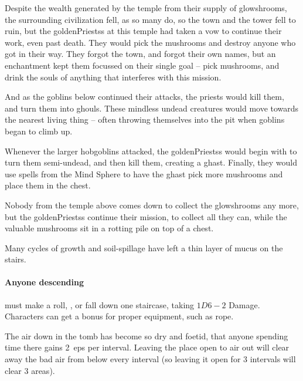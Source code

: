 \begin{multicols}{2}


\begin{exampletext}

  Despite the wealth generated by the temple from their supply of glowshrooms, the surrounding civilization fell, as so many do, so the town and the tower fell to ruin, but the \glspl{goldenPriests} at this temple had taken a vow to continue their work, even past death.
  They would pick the mushrooms and destroy anyone who got in their way.
  They forgot the town, and forgot their own names, but an enchantment kept them focussed on their single goal -- pick mushrooms, and drink the souls of anything that interferes with this mission.

  And as the goblins below continued their attacks, the priests would kill them, and turn them into ghouls.
  These mindless undead creatures would move towards the nearest living thing -- often throwing themselves into the pit when goblins began to climb up.

  Whenever the larger hobgoblins attacked, the \glspl{goldenPriests} would begin with  to turn them semi-undead, and then kill them, creating a ghast.%
  Finally, they would use spells from the Mind Sphere to have the ghast pick more mushrooms and place them in the chest.

  Nobody from the temple above comes down to collect the glowshrooms any more, but the \glspl{goldenPriests} continue their mission, to collect all they can, while the valuable mushrooms sit in a rotting pile on top of a chest.
\end{exampletext}

Many \glspl{cycle} of growth and soil-spillage have left a thin layer of mucus on the stairs.

\paragraph{Anyone descending}
must make a  roll, \tn[8], or fall down one staircase, taking $1D6-2$ Damage.
Characters can get a bonus for proper equipment, such as rope.

The air down in the tomb has become so dry and foetid, that anyone spending time there gains 2~\glspl{ep} per \gls{interval}.
Leaving the place open to air out will clear away the bad air from  below every \gls{interval} (so leaving it open for 3 \glspl{interval} will clear 3 \glspl{area}).


\end{multicols}
